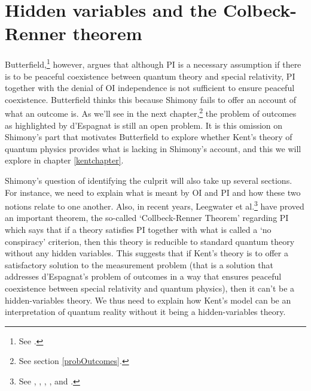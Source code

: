 \section{Hidden variables and the Colbeck-Renner theorem}


Butterfield,\footnote{See \cite{Butterfield}.} however, argues that although PI is a necessary assumption if there is to be peaceful coexistence between quantum theory and special relativity, PI together with the denial of OI independence is not sufficient to ensure peaceful coexistence. Butterfield thinks this because Shimony fails to offer an account of what an outcome is. As we'll see in the next chapter,\footnote{See section \ref{probOutcomes}.} the problem of outcomes as highlighted by d'Espagnat is still an open problem. It is this omission on Shimony's part that motivates Butterfield to explore whether Kent's theory of quantum physics provides what is lacking in Shimony's account, and this we will explore in chapter \ref{kentchapter}. 


Shimony's question of identifying the culprit will also take up several sections. For instance, we need to explain what is meant by OI and PI and how these two notions relate to one another. Also, in recent years,  Leegwater et al.\footnote{See \cite{LeegwaterGijs2016Aitf}, \cite{ColbeckRoger2011Neoq}, \cite{ColbeckRoger2012Tcoq}, \cite{LandsmanK2015OtCt}, and \cite{Landsman}.} have  proved an important theorem, the so-called {`Collbeck-Renner Theorem'} regarding PI which says that if a theory satisfies PI together with what is called a {`no conspiracy'} criterion,\label{noconspiracy} then this theory is reducible to standard quantum theory without any hidden variables. This suggests that if Kent's theory is to offer a satisfactory solution to the measurement problem (that is a solution that addresses d'Espagnat's problem of outcomes in a way that  ensures peaceful coexistence between special relativity and quantum physics), then it can't be a hidden-variables theory. We thus need to explain how Kent's model can be an interpretation of quantum reality without it being a hidden-variables theory. 




